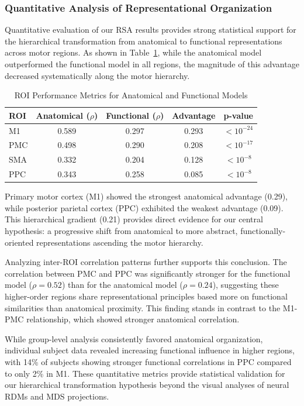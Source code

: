 \documentclass{article}
\begin{document}
\subsubsection{Quantitative Analysis of Representational Organization}

Quantitative evaluation of our RSA results provides strong statistical support for the hierarchical transformation from anatomical to functional representations across motor regions. As shown in Table~\ref{tab:roi_metrics}, while the anatomical model outperformed the functional model in all regions, the magnitude of this advantage decreased systematically along the motor hierarchy.

\begin{table}[h]
\centering
\caption{ROI Performance Metrics for Anatomical and Functional Models}
\label{tab:roi_metrics}
\begin{tabular}{|l|c|c|c|c|}
\hline
\textbf{ROI} & \textbf{Anatomical ($\rho$)} & \textbf{Functional ($\rho$)} & \textbf{Advantage} & \textbf{p-value} \\
\hline
M1 & 0.589 & 0.297 & 0.293 & $< 10^{-24}$ \\
PMC & 0.498 & 0.290 & 0.208 & $< 10^{-17}$ \\
SMA & 0.332 & 0.204 & 0.128 & $< 10^{-8}$ \\
PPC & 0.343 & 0.258 & 0.085 & $< 10^{-8}$ \\
\hline
\end{tabular}
\end{table}

Primary motor cortex (M1) showed the strongest anatomical advantage (0.29), while posterior parietal cortex (PPC) exhibited the weakest advantage (0.09). This hierarchical gradient (0.21) provides direct evidence for our central hypothesis: a progressive shift from anatomical to more abstract, functionally-oriented representations ascending the motor hierarchy.

Analyzing inter-ROI correlation patterns further supports this conclusion. The correlation between PMC and PPC was significantly stronger for the functional model ($\rho = 0.52$) than for the anatomical model ($\rho = 0.24$), suggesting these higher-order regions share representational principles based more on functional similarities than anatomical proximity. This finding stands in contrast to the M1-PMC relationship, which showed stronger anatomical correlation.

While group-level analysis consistently favored anatomical organization, individual subject data revealed increasing functional influence in higher regions, with 14\% of subjects showing stronger functional correlations in PPC compared to only 2\% in M1. These quantitative metrics provide statistical validation for our hierarchical transformation hypothesis beyond the visual analyses of neural RDMs and MDS projections.
\end{document}
